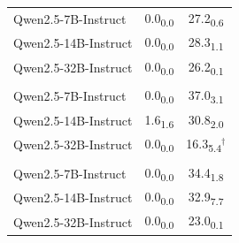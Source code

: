 \begin{table}
\begin{tabular}{l cc}
Qwen2.5-7B-Instruct & 0.0\textsubscript{0.0} & 27.2\textsubscript{0.6} \\
Qwen2.5-14B-Instruct & 0.0\textsubscript{0.0} & 28.3\textsubscript{1.1} \\
Qwen2.5-32B-Instruct & 0.0\textsubscript{0.0} & 26.2\textsubscript{0.1} \\
\addlinespace
\multicolumn{3}{l}{\textit{\textbf{MMLU-Stem}}} \\
Qwen2.5-7B-Instruct & 0.0\textsubscript{0.0} & 37.0\textsubscript{3.1} \\
Qwen2.5-14B-Instruct & 1.6\textsubscript{1.6} & 30.8\textsubscript{2.0} \\
Qwen2.5-32B-Instruct & 0.0\textsubscript{0.0} & 16.3\textsubscript{5.4}$^\dagger$ \\
\addlinespace
\multicolumn{3}{l}{\textit{\textbf{MMLU-HSS}}} \\
Qwen2.5-7B-Instruct & 0.0\textsubscript{0.0} & 34.4\textsubscript{1.8} \\
Qwen2.5-14B-Instruct & 0.0\textsubscript{0.0} & 32.9\textsubscript{7.7} \\
Qwen2.5-32B-Instruct & 0.0\textsubscript{0.0} & 23.0\textsubscript{0.1} \\
\bottomrule
\end{tabular}
\vspace{-0.4cm}
\end{table}
